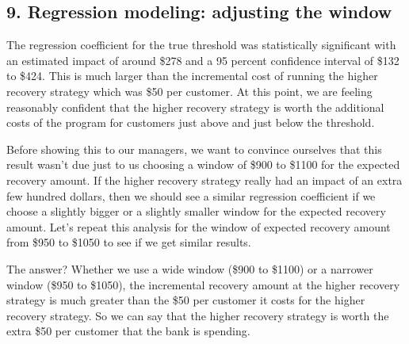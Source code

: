 \documentclass[11pt]{article}
\begin{document}
    \subsection{9. Regression modeling: adjusting the
window}\label{regression-modeling-adjusting-the-window}

The regression coefficient for the true threshold was statistically
significant with an estimated impact of around \$278 and a 95 percent
confidence interval of \$132 to \$424. This is much larger than the
incremental cost of running the higher recovery strategy which was \$50
per customer. At this point, we are feeling reasonably confident that
the higher recovery strategy is worth the additional costs of the
program for customers just above and just below the threshold.

Before showing this to our managers, we want to convince ourselves that
this result wasn't due just to us choosing a window of \$900 to \$1100
for the expected recovery amount. If the higher recovery strategy really
had an impact of an extra few hundred dollars, then we should see a
similar regression coefficient if we choose a slightly bigger or a
slightly smaller window for the expected recovery amount. Let's repeat
this analysis for the window of expected recovery amount from \$950 to
\$1050 to see if we get similar results.

The answer? Whether we use a wide window (\$900 to \$1100) or a narrower
window (\$950 to \$1050), the incremental recovery amount at the higher
recovery strategy is much greater than the \$50 per customer it costs
for the higher recovery strategy. So we can say that the higher recovery
strategy is worth the extra \$50 per customer that the bank is spending.
\end{document}
